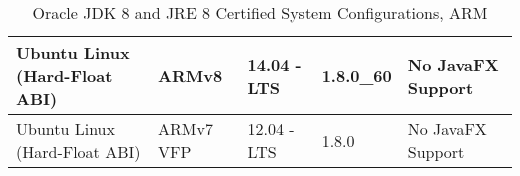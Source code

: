 \begin{table}
\begin{tabular}{ | p{3cm} | l | l | l | p{4cm} | }
Ubuntu Linux
 (Hard-Float ABI) & ARMv8     & 14.04 - LTS & 1.8.0\_60 & No JavaFX Support  \\ \hline 
Ubuntu Linux
 (Hard-Float ABI) & ARMv7 VFP & 12.04 - LTS & 1.8.0     & No JavaFX Support \\ \hline 

\end{tabular}
\caption{Oracle JDK 8 and JRE 8 Certified System Configurations, ARM \cite{OracleOracleConfigurations}}
\end{table}


